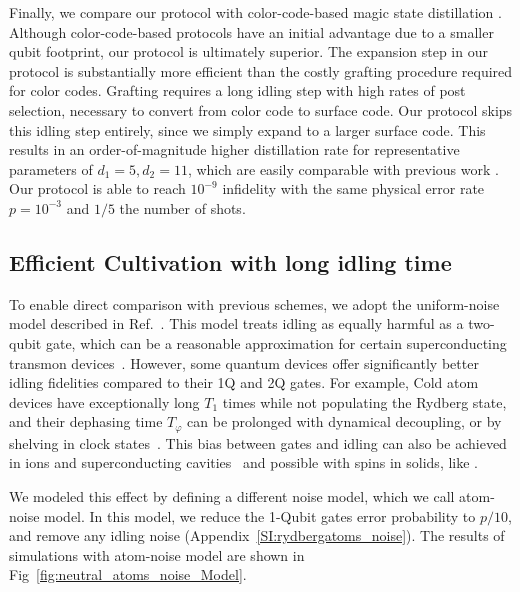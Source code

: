 \documentclass[twocolumn,notitlepage,nofootinbib,floatfix,superscriptaddress]{revtex4-1}
\begin{document}
Finally, we compare our protocol with color-code-based magic state distillation \cite{chamberland2020very, gidney2024magic}. Although color-code-based protocols have an initial advantage due to a smaller qubit footprint, our protocol is ultimately superior. The expansion step in our protocol is substantially more efficient than the costly grafting procedure required for color codes. Grafting requires a long idling step with high rates of post selection, necessary to convert from color code to surface code. Our protocol skips this idling step entirely, since we simply expand to a larger surface code. This results in an order-of-magnitude higher distillation rate for representative parameters of $d_1=5, d_2=11$, which are easily comparable with previous work \cite{gidney2024magic}. Our protocol is able to reach $10^{-9}$ infidelity with the same physical error rate $p=10^{-3}$ and $1/5$ the number of shots.


\subsection{Efficient Cultivation with long idling time}

To enable direct comparison with previous schemes, we adopt the uniform-noise model described in Ref.~\cite{gidney2024magic}. 
This model treats idling as equally harmful as a two-qubit gate, which can be a reasonable approximation for certain superconducting transmon devices~\cite{hashim2020randomized, foxen2020demonstrating}.
However, some quantum devices offer significantly better idling fidelities compared to their 1Q and 2Q gates. For example, Cold atom devices have exceptionally long $T_1$ times while not populating the Rydberg state, and their dephasing time $T_\varphi$ can be prolonged with dynamical decoupling, or by shelving in clock states~\cite{manetsch2025tweezerarray6100highly, bluvstein2025architectural}. This bias between gates and idling can also be achieved in ions and superconducting cavities~\cite{ryananderson2022ions,Ryan-Anderson2021ionsNoise2,leblond2025logicalerrorratessurface} and possible with spins in solids, like \cite{steinacker2024300}.

We modeled this effect by defining a different noise model, which we call atom-noise model. In this model, we reduce the 1-Qubit gates error probability to $p/10$, and remove any idling noise (Appendix~\ref{SI:rydbergatoms_noise}). The results of simulations with atom-noise model are shown in Fig~\ref{fig:neutral_atoms_noise_Model}.
\end{document}
